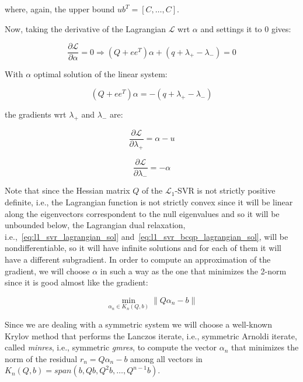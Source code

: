 where, again, the upper bound $ub^T = [C, \dots, C]$.

Now, taking the derivative of the Lagrangian $\mathcal{L}$ wrt $\alpha$ and settings it to 0 gives:

\begin{equation} \label{eq:l1_svr_bcqp_lagrangian_der_a}
	\frac{\partial \mathcal{L}}{\partial \alpha}=0\Rightarrow (Q + ee^T) \alpha + (q + \lambda_+ - \lambda_-) = 0
\end{equation}

With $\alpha$ optimal solution of the linear system:

\begin{equation} \label{eq:l1_svr_bcqp_lagrangian_sol}
    (Q + ee^T) \alpha = - (q + \lambda_+ - \lambda_-)
\end{equation}

the gradients wrt $\lambda_+$ and $\lambda_-$ are:

\begin{equation} \label{eq:l1_svr_bcqp_lagrangian_der_lp}
	\frac{\partial \mathcal{L}}{\partial \lambda_+}=\alpha - u
\end{equation}

\begin{equation} \label{eq:l1_svr_bcqp_lagrangian_der_lm}
    \frac{\partial \mathcal{L}}{\partial \lambda_-}=-\alpha
\end{equation}

\bigskip

Note that since the Hessian matrix $Q$ of the $\mathcal{L}_1$-SVR is not strictly positive definite, i.e., the Lagrangian function is not strictly convex since it will be linear along the eigenvectors correspondent to the null eigenvalues and so it will be unbounded below, the Lagrangian dual relaxation, i.e.,~\ref{eq:l1_svr_lagrangian_sol} and~\ref{eq:l1_svr_bcqp_lagrangian_sol}, will be nondifferentiable, so it will have infinite solutions and for each of them it will have a different subgradient. In order to compute an approximation of the gradient, we will choose $\alpha$ in such a way as the one that minimizes the 2-norm since it is good almost like the gradient:

\begin{equation} \label{eq:svr_lagrangian_krylov_sol}
	\min_{\alpha_n \in K_n(Q, b)} \| Q \alpha_n - b \|
\end{equation}

Since we are dealing with a symmetric system we will choose a well-known Krylov method that performs the Lanczos iterate, i.e., symmetric Arnoldi iterate, called \emph{minres}, i.e., symmetric \emph{gmres}, to compute the vector $\alpha_n$ that minimizes the norm of the residual $r_n = Q \alpha_n - b$ among all vectors in $K_n(Q, b) = span(b, Qb, Q^2b, \dots, Q^{n-1}b)$.

